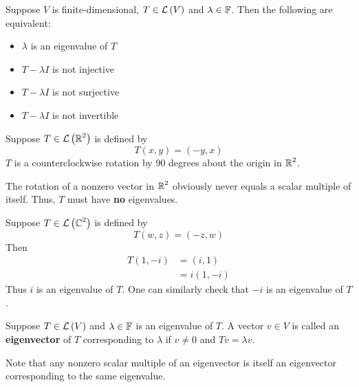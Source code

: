 \begin{theorem}
    Suppose $V$ is finite-dimensional, $T \in \mathcal{L} \left( V \right)$ and $\lambda \in \operatorname{\mathbb{F}}$. Then the following
    are equivalent:
    \begin{itemize}
        \item $\lambda$ is an eigenvalue of $T$
        \item $T - \lambda I$ is not injective
        \item $T - \lambda I$ is not surjective
        \item $T - \lambda I$ is not invertible
    \end{itemize}
\end{theorem}

\begin{example}
    Suppose $T \in \mathcal{L} \left( \operatorname{\mathbb{R}}^2 \right)$ is defined by
    \[ T(x, y) = (-y, x) \]
    $T$ is a counterclockwise rotation by 90 degrees about the origin in $\operatorname{\mathbb{R}}^2$.

    The rotation of a nonzero vector in $\operatorname{\mathbb{R}}^2$ obviously never equals a scalar multiple of itself.
    Thus, $T$ must have \textbf{no} eigenvalues.

    Suppose $T \in \mathcal{L} \left( \operatorname{\mathbb{C}}^2 \right)$ is defined by
    \[ T(w, z) = (-z, w) \]
    Then
    \begin{align*}
        T(1, -i) &= (i, 1) \\
        &= i(1, -i)
    \end{align*}
    Thus $i$ is an eigenvalue of $T$. One can similarly check that $-i$ is an eigenvalue of $T$.
\end{example}

\begin{definition} [Eigenvector]
    Suppose $T \in \mathcal{L} \left( V \right)$ and $\lambda \in \operatorname{\mathbb{F}}$ is an eigenvalue of $T$. A vector $v \in V$
    is called an \textbf{eigenvector} of $T$ corresponding to $\lambda$ if $v \neq 0$ and $Tv = \lambda v$.
\end{definition}

Note that any nonzero scalar multiple of an eigenvector is itself an eigenvector corresponding to the same eigenvalue.


